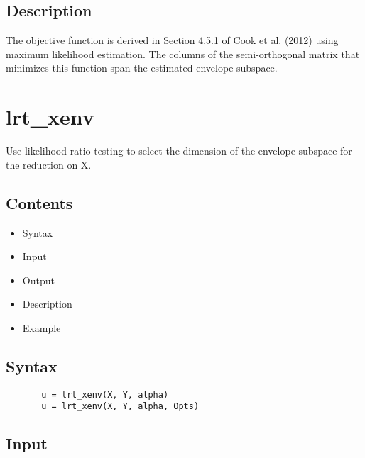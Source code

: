 \documentclass[a4paper,11pt,openany]{memoir}
\begin{document}
\subsection*{Description}

\begin{par}
The objective function is derived in Section 4.5.1 of Cook et al. (2012)  using maximum likelihood estimation. The columns of the semi-orthogonal matrix that minimizes this function span the estimated envelope subspace.
\end{par} \vspace{1em}

    
\newpage    

\rmfamily
\color{black}\section{lrt\_xenv}

\begin{par}
Use likelihood ratio testing to select the dimension of the envelope subspace for the reduction on X.
\end{par} \vspace{1em}

\subsection*{Contents}

\begin{itemize}
\setlength{\itemsep}{-1ex}
   \item Syntax
   \item Input
   \item Output
   \item Description
   \item Example
\end{itemize}


\subsection*{Syntax}


\begin{verbatim}       u = lrt_xenv(X, Y, alpha)
       u = lrt_xenv(X, Y, alpha, Opts)\end{verbatim}
    

\subsection*{Input}
\end{document}
